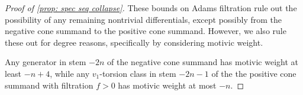 \documentclass[10pt,a4paper]{amsart}
\DeclareMathOperator{\Ext}{Ext}
\newcommand{\cE}{{\mathcal E}}
\begin{document}
\begin{proof}[Proof of \cref{prop: spec seq collapse}]
These bounds on Adams filtration rule out the possibility of any remaining nontrivial differentials, except possibly from the negative cone summand to the positive cone summand. However, we also rule these out for degree reasons, specifically by considering motivic weight.

Any generator in stem $-2n$ of the negative cone summand has motivic weight at least $-n + 4$, while any $v_{1}$-torsion class in stem $-2n-1$ of the the positive cone summand with filtration $f > 0$ has  motivic weight at most $-n$. 

\end{proof}
\end{document}
